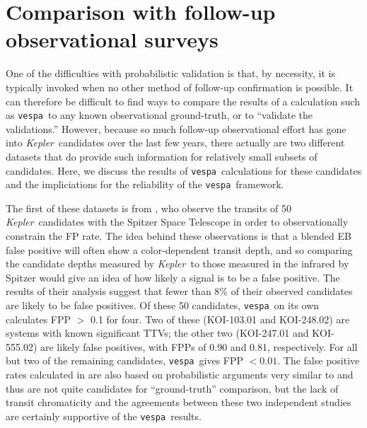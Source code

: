 \documentclass{emulateapj}
\newcommand{\sectlabel}[1]{\label{sect:#1}}
\newcommand{\kepler}{\textit{Kepler}}
\newcommand{\vespa}{\texttt{vespa}}
\begin{document}
\section{Comparison with follow-up observational surveys}
\sectlabel{comparisons} 

One of the difficulties with probabilistic
validation is that, by necessity, it is typically invoked when no
other method of follow-up confirmation is possible.  It can therefore
be difficult to find ways to compare the results of a calculation such
as \vespa\ to any known observational ground-truth, or to ``validate
the validations.''  However, because so much follow-up observational
effort has gone into \kepler\ candidates over the last few years,
there actually are two different datasets that do provide such
information for relatively small subsets of candidates.  Here, we
discuss the results of \vespa\ calculations for these candidates and
the impliciations for the reliability of the \vespa\ framework.

The first of these datasets is from \citet{Desert:2015}, who observe
the transits of 50 \kepler\ candidates with the Spitzer Space
Telescope in order to observationally constrain the FP rate.  The idea
behind these observations is that a blended EB false positive will
often show a color-dependent transit depth, and so comparing the
candidate depths measured by \kepler\ to those measured in the
infrared by Spitzer would give an idea of how likely a signal is to be
a false positive. The results of their analysis suggest that fewer
than 8\% of their observed candidates are likely to be false
positives.  Of these 50 candidates, \vespa\ on its own calculates FPP
$>$ 0.1 for four.  Two of these (KOI-103.01 and KOI-248.02) are
systems with known significant TTVs; the other two (KOI-247.01 and
KOI-555.02) are likely false positives, with FPPs of 0.90 and 0.81,
respectively.  For all but two of the remaining candidates, \vespa\
gives FPP $< 0.01$.  The false positive rates calculated in
\citet{Desert:2015} are also based on probabilistic arguments very
similar to \citet{Morton:2011b} and thus are not quite candidates for
``ground-truth'' comparison, but the lack of transit chromaticity and
the agreements between these two independent studies are certainly
supportive of the \vespa\ results.
\end{document}
